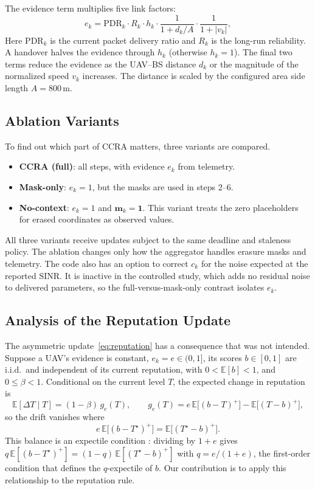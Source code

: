 The evidence term multiplies five link factors:
\begin{equation}
  e_k=\mathrm{PDR}_k\cdot R_k\cdot h_k\cdot\frac{1}{1+d_k/A}\cdot\frac{1}{1+|v_k|},
\end{equation}
Here $\mathrm{PDR}_k$ is the current packet delivery ratio and $R_k$ is the
long-run reliability. A handover halves the evidence through $h_k$ (otherwise
$h_k=1$). The final two terms reduce the evidence as the UAV--BS distance $d_k$
or the magnitude of the normalized speed $v_k$ increases. The distance is scaled
by the configured area side length $A=800$\,m.

\subsection{Ablation Variants}
To find out which part of CCRA matters, three variants are compared.
\begin{itemize}
\item \textbf{CCRA (full)}: all steps, with evidence $e_k$ from telemetry.
\item \textbf{Mask-only}: $e_k=1$, but the masks are used in steps 2--6.
\item \textbf{No-context}: $e_k=1$ and $\mathbf{m}_k=\mathbf{1}$. This variant
  treats the zero placeholders for erased coordinates as observed values.
\end{itemize}
All three variants receive updates subject to the same deadline and staleness
policy. The ablation changes only how the aggregator handles erasure masks and
telemetry.
The code also has an option to correct $c_k$ for the noise expected at the
reported SINR. It is inactive in the controlled study, which adds no residual noise
to delivered parameters, so the full-versus-mask-only contrast isolates $e_k$.

\subsection{Analysis of the Reputation Update}
\label{sec:fixed-point}
The asymmetric update~\eqref{eq:reputation} has a consequence that was not intended.
Suppose a UAV's evidence is constant, $e_k=e\in(0,1]$, its scores $b\in[0,1]$ are
i.i.d.\ and independent of its current reputation, with $0<\mathbb{E}[b]<1$, and
$0\le\beta<1$. Conditional on the current level $T$, the expected change in reputation
is
\begin{equation}
  \mathbb{E}[\Delta T\mid T] = (1-\beta)\,g_e(T),\qquad
  g_e(T)=e\,\mathbb{E}\bigl[(b-T)^+\bigr]-\mathbb{E}\bigl[(T-b)^+\bigr],
\end{equation}
so the drift vanishes where
\begin{equation}
  e\,\mathbb{E}\bigl[(b-T^\star)^+\bigr] = \mathbb{E}\bigl[(T^\star-b)^+\bigr].
  \label{eq:fixed-point}
\end{equation}
This balance is an expectile condition \cite{newey1987expectile}: dividing by $1+e$
gives $q\,\mathbb{E}[(b-T^\star)^+]=(1-q)\,\mathbb{E}[(T^\star-b)^+]$ with
$q=e/(1+e)$, the first-order condition that defines the $q$-expectile of $b$. Our
contribution is to apply this relationship to the reputation rule.

